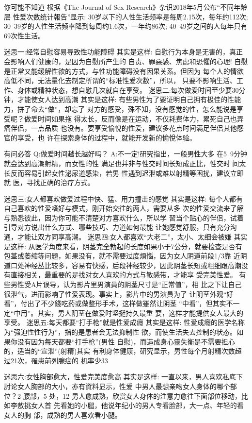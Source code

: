 \documentclass[12pt,UTF8]{ctexbook}
\begin{document}
你可能不知道
根据《The Journal of Sex Research》杂识2018年5月公布“不同年龄层
性爱次数统计報告”显示:
30岁以下的人性生活频率是每周2.15次，每年约112次;
30~39岁的人性生活频率降到每周约1.6次，一年约86次;
40~49岁之间的人每年只有69次性生活。

迷思一:经常自慰容易导致性功能障碍
其实是这样:
自慰行为本身是无害的，真正会影响人们健康的，是因为自慰所产生的
自责、罪惡感、焦虑和恐懼的心理!
自慰是正常又能缓解性欲的方式，与性功能障碍没有因果关系。但因为
每个人的情欲高低不同，无法量化去制定所谓的“标准性爱次数”，所以，
只要不影响生活、工作、身体或精神状态，想自慰几次就自在享受。
迷思二:每次做爱时间至少要30分钟，才能使女人达到高潮
其实是这样:
有些男性为了要证明自己拥有极佳的性能力，拼了命去“做”，却忘了
对方的感受，殊不知，没有感觉的性，怎么能说是享受呢？做爱时间如果拖
得太长，反而像是在运动，不仅耗费体力，累死自己也弄痛伴侣，一点品质
也没有。要享受愉悅的性爱，建议多花点时间满足伴侣其他感官的享受，也
许在探索身体的过程中，就能开发新的愉悅体验。

有问必答
Q:做爱时间越长越好吗？
A:不一定!研究指出，一般男性大多
在5~9分钟就会达到高潮射精，而女性的性
满足也并非与性交时间长短成正比，性交时
间太长反而容易引起女性泌尿道感染，若男
性遇到迟泄或难以射精等困扰，建议立即就
医，寻找正确的治疗方式。

迷思三:女人都喜欢做爱过程中快、猛、用力撞击的感觉
其实是这样:
每个人都有自己喜欢的性爱嗜好与模式，刚开始交往的两人，需要从多
次的性爱交流来了解与熟悉彼此，因为你可能不清楚对方喜欢什么，所以学
習当个贴心的伴侣，试着引导对方说出什么方式、哪些技巧、力道如何最能
让她感觉舒服，只有充分沟通，才能让双方同享高潮。
迷思四:女人都喜欢“大老二”，太小、太细会被嫌
其实是这样:
从医学角度来看，阴茎完全勃起的长度如果小于7公分，就要检查是否有
包茎或萎缩等问题，如果没有，就不需要过度煩惱，因为女人阴道前段1/3靠
近阴道口处神经丛比较多，容易有快感，后段神经较少，因此阴茎长短或粗细跟高潮没有直接相关，最重要的是找对女人喜欢的方式与敏感带，才能享
受完美性爱。
有些男性受A片误导，认为影片里男演員的阴茎尺寸是“正常值”，相
比之下让自己很泄气，进而影响了性爱表现。事实上，影片中的男演員为了
让阴茎外观“好看”，付出了不少錢吃药或做整形手术，这样做雖然让阴茎
“中看”，但其实不一定“中用”。其实，男人阴茎在做爱时坚挺持久最重
要，这样才能提供女人最大的享受。
迷思五:每天都要“打手枪”就是性爱成癮
其实是这样:
性爱成癮的医学名称为“强迫性性行为”，指的是患者会无法抑制性
欲，而使生活失去控制的状态。如果你没有因为每天都要“打手枪”(男性
自慰)，而造成身心靈失衡是不需要担心的，适当的“宣泄”(射精)其实
有利身体健康，研究显示，男性每个月射精次数超过21次，罹患前列腺癌的
机率少33%

迷思六:女性胸部愈大，性爱完美度愈高
其实是这样:
一直以来，男人喜欢私底下討论女人胸部的大小，亦有資料显示，性爱
中男人最想亲吻女人身体的哪个部位？2%
腰部，5%
处，12%
男人愈成熟，欣赏女人身体的注意力愈往下面部位移动，比如李敖挑女人首
先看她的小腿，他说年纪小的男人专看脸部，大一点、年轻的看女人的胸
部，成熟的男人喜欢看小腿。
\end{document}
